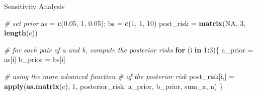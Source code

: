 \documentclass[
  ignorenonframetext,
]{beamer}
\newenvironment{Shaded}{\begin{snugshade}}{\end{snugshade}}
\newcommand{\CommentTok}[1]{\textcolor[rgb]{0.56,0.35,0.01}{\textit{#1}}}
\newcommand{\ControlFlowTok}[1]{\textcolor[rgb]{0.13,0.29,0.53}{\textbf{#1}}}
\newcommand{\DecValTok}[1]{\textcolor[rgb]{0.00,0.00,0.81}{#1}}
\newcommand{\FloatTok}[1]{\textcolor[rgb]{0.00,0.00,0.81}{#1}}
\newcommand{\KeywordTok}[1]{\textcolor[rgb]{0.13,0.29,0.53}{\textbf{#1}}}
\newcommand{\NormalTok}[1]{#1}
\newcommand{\OperatorTok}[1]{\textcolor[rgb]{0.81,0.36,0.00}{\textbf{#1}}}
\newcommand{\OtherTok}[1]{\textcolor[rgb]{0.56,0.35,0.01}{#1}}
\newcommand{\StringTok}[1]{\textcolor[rgb]{0.31,0.60,0.02}{#1}}
\begin{document}
\begin{frame}[fragile]{Sensitivity Analysis}
\protect\hypertarget{sensitivity-analysis-1}{}

\begin{Shaded}
\begin{Highlighting}[]
\CommentTok{# set prior}
\NormalTok{as =}\StringTok{ }\KeywordTok{c}\NormalTok{(}\FloatTok{0.05}\NormalTok{, }\DecValTok{1}\NormalTok{, }\FloatTok{0.05}\NormalTok{); bs =}\StringTok{ }\KeywordTok{c}\NormalTok{(}\DecValTok{1}\NormalTok{, }\DecValTok{1}\NormalTok{, }\DecValTok{10}\NormalTok{)}
\NormalTok{post_risk =}\StringTok{ }\KeywordTok{matrix}\NormalTok{(}\OtherTok{NA}\NormalTok{, }\DecValTok{3}\NormalTok{, }\KeywordTok{length}\NormalTok{(c))}

\CommentTok{# for each pair of a and b, compute the posterior risks}
\ControlFlowTok{for}\NormalTok{ (i }\ControlFlowTok{in} \DecValTok{1}\OperatorTok{:}\DecValTok{3}\NormalTok{)\{}
\NormalTok{  a_prior =}\StringTok{ }\NormalTok{as[i]}
\NormalTok{  b_prior =}\StringTok{ }\NormalTok{bs[i]}

  \CommentTok{# using the more advanced function }
  \CommentTok{# of the posterior risk  }
\NormalTok{post_risk[i,] =}\StringTok{ }\KeywordTok{apply}\NormalTok{(}\KeywordTok{as.matrix}\NormalTok{(c), }\DecValTok{1}\NormalTok{,}
\NormalTok{                      posterior_risk, a_prior,}
\NormalTok{                      b_prior, sum_x, n)}
\NormalTok{\}}
\end{Highlighting}
\end{Shaded}

\end{frame}
\end{document}
